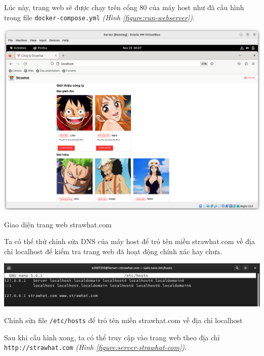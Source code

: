 \documentclass[a4paper, 11pt]{article}
\begin{document}
Lúc này, trang web sẽ được chạy trên cổng 80 của máy host như đã cấu hình trong file \texttt{docker-compose.yml} \textit{(Hình \ref{figure:run-webserver})}.

\begin{minipage}
    {\linewidth}
    \captionsetup{type=figure}
    \centering
    \includegraphics[width=\linewidth]{images/strawhat-localhost.png}
    \caption{Giao diện trang web strawhat.com}
    \label{figure:strawhat-localhost}
\end{minipage}

Ta có thể thử chỉnh sửa DNS của máy host để trỏ tên miền strawhat.com về địa chỉ localhost để kiểm tra trang web đã hoạt động chính xác hay chưa.

\begin{minipage}
    {\linewidth}
    \captionsetup{type=figure}
    \centering
    \includegraphics[width=\linewidth]{images/edit-etc-hosts.png}
    \caption{Chỉnh sửa file \texttt{/etc/hosts} để trỏ tên miền strawhat.com về địa chỉ localhost}
    \label{figure:edit-etc-hosts}
\end{minipage}

Sau khi cấu hình xong, ta có thể truy cập vào trang web theo địa chỉ \texttt{http://strawhat.com} \textit{(Hình \ref{figure:server-strawhat-com})}.
\end{document}
